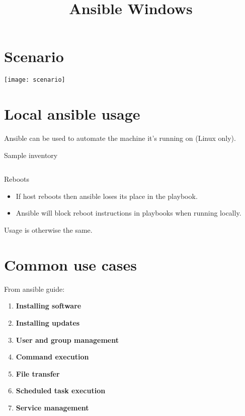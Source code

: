 \documentclass[slides]{pgnotes}
\title{Ansible Windows}
\begin{document}
\maketitle

\tableofcontents

\section{Scenario}

\begin{center}
\texttt{[image: scenario]}
\end{center}


\section{Local ansible usage}

Ansible can be used to automate the machine it's running on (Linux only).

\begin{bluebox}{Sample inventory}
\inputminted{ini}{control_inventory.ini}
\end{bluebox}

\begin{redbox}{Reboots}
  \begin{itemize}
  \item If host reboots then ansible loses its place in the playbook.
  \item Ansible will block reboot instructions in playbooks when running locally.
  \end{itemize}
\end{redbox}

Usage is otherwise the same.


\section{Common use cases}

From ansible guide: 

\begin{enumerate}

\item \textbf{Installing software}

\item \textbf{Installing updates}

\item \textbf{User and group management}

\item \textbf{Command execution}

\item \textbf{File transfer}

\item \textbf{Scheduled task execution}

\item \textbf{Service management}

\end{enumerate}
\end{document}

